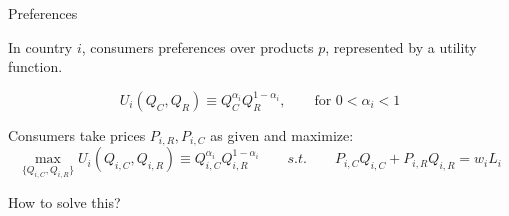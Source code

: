 \documentclass[notes,11pt, aspectratio=169, xcolor=table]{beamer}
\newenvironment{wideitemize}{\itemize\addtolength{\itemsep}{10pt}}{\enditemize}
\begin{document}
\begin{frame}{Preferences}
\begin{wideitemize}
        \item In country $i$, consumers preferences over products $p$, represented by a utility function. 

        \begin{equation*}
            U_i(Q_C,Q_R) \equiv Q_C^{\alpha_i} Q_R^{1-\alpha_i}, \qquad \text{for } 0 < \alpha_i < 1   
        \end{equation*}
        \item<2-> Consumers take prices $P_{i,R},P_{i,C}$ as given and maximize: 
        \begin{equation*}
            \max_{\{Q_{i,C}, Q_{i,R}\}} U_i(Q_{i,C}, Q_{i,R}) \equiv Q_{i,C}^{\alpha_i} Q_{i,R}^{1-\alpha_i} \qquad s.t. \qquad P_{i,C} Q_{i,C} + P_{i,R} Q_{i,R} = w_i L_i
        \end{equation*}
        \item<3-> How to solve this?
        \end{wideitemize}
\end{frame}
\end{document}
